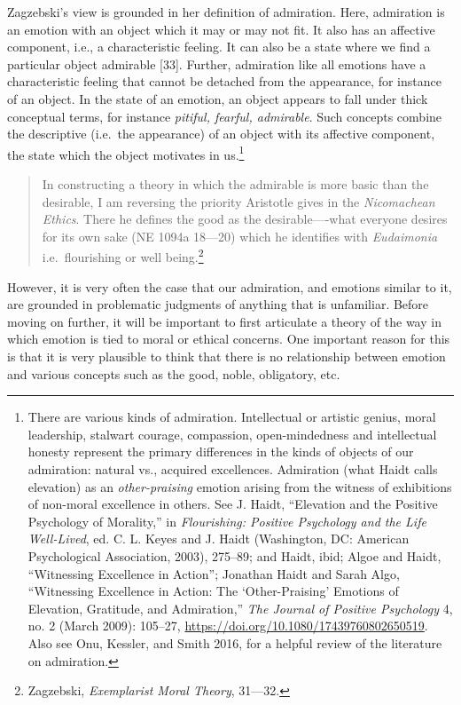 \documentclass[phdthesis,12pt,final]{wuthesis}
\theoremstyle{definition}
\theoremstyle{definition}
\theoremstyle{definition}
\theoremstyle{definition}
\theoremstyle{remark}
\begin{document}
Zagzebski's view is grounded in her definition of admiration. Here, admiration is an emotion with an object which it may or may not fit. It also has an affective component, i.e., a characteristic feeling. It can also be a state where we find a particular object admirable {[}33{]}. Further, admiration like all emotions have a characteristic feeling that cannot be detached from the appearance, for instance of an object. In the state of an emotion, an object appears to fall under thick conceptual terms, for instance \emph{pitiful, fearful, admirable}. Such concepts combine the descriptive (i.e.~the appearance) of an object with its affective component, the state which the object motivates in us.\footnote{There are various kinds of admiration. Intellectual or artistic genius, moral leadership, stalwart courage, compassion, open-mindedness and intellectual honesty represent the primary differences in the kinds of objects of our admiration: natural vs., acquired excellences. Admiration (what Haidt calls elevation) as an \emph{other-praising} emotion arising from the witness of exhibitions of non-moral excellence in others. See J. Haidt, {``Elevation and the Positive Psychology of Morality,''} in \emph{Flourishing: {Positive} Psychology and the Life Well-Lived}, ed. C. L. Keyes and J. Haidt (Washington, DC: American Psychological Association, 2003), 275--89; and Haidt, ibid; Algoe and Haidt, {``Witnessing Excellence in Action''}; Jonathan Haidt and Sarah Algo, {``Witnessing {Excellence} in {Action}: {The} {`{Other-Praising}'} {Emotions} of {Elevation}, {Gratitude}, and {Admiration},''} \emph{The Journal of Positive Psychology} 4, no. 2 (March 2009): 105--27, \url{https://doi.org/10.1080/17439760802650519}. Also see Onu, Kessler, and Smith 2016, for a helpful review of the literature on admiration.}

\begin{quote}
In constructing a theory in which the admirable is more basic than the desirable, I am reversing the priority Aristotle gives in the \emph{Nicomachean Ethics}. There he defines the good as the desirable----what everyone desires for its own sake (NE 1094a 18---20) which he identifies with \emph{Eudaimonia} i.e.~flourishing or well being.\footnote{Zagzebski, \emph{Exemplarist {Moral Theory}}, 31---32.}
\end{quote}

However, it is very often the case that our admiration, and emotions similar to it, are grounded in problematic judgments of anything that is unfamiliar. Before moving on further, it will be important to first articulate a theory of the way in which emotion is tied to moral or ethical concerns. One important reason for this is that it is very plausible to think that there is no relationship between emotion and various concepts such as the good, noble, obligatory, etc.
\end{document}
